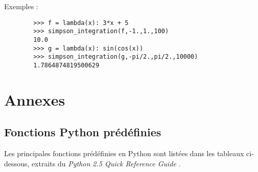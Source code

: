 \begin{description}
\begin{description}
		Exemples : \begin{py}{10cm}
		\begin{verbatim}
		>>> f = lambda(x): 3*x + 5
		>>> simpson_integration(f,-1.,1.,100)
		10.0
		>>> g = lambda(x): sin(cos(x))
		>>> simpson_integration(g,-pi/2.,pi/2.,10000)
		1.7864874819500629
		\end{verbatim}
		\end{py}
	\end{description}

\end{description}

\newpage
\setlength{\textwidth}{16cm}
\setlength{\linewidth}{16cm}
\setlength{\textheight}{16cm}
\setlength{\marginparwidth}{8cm}
\setlength{\marginparsep}{1cm}
\setlength{\oddsidemargin}{0cm}
\setlength{\evensidemargin}{+8cm}
\setlength{\topmargin}{-0.75cm}

\section{Annexes}

\subsection{Fonctions {\sc Python} prédéfinies}\label{python:fonctions}
Les principales fonctions prédéfinies en {\sc Python} sont listées dans les tableaux
ci-dessous, extraits du {\em {\sc Python} 2.5 Quick Reference Guide} \cite{gruet}.

